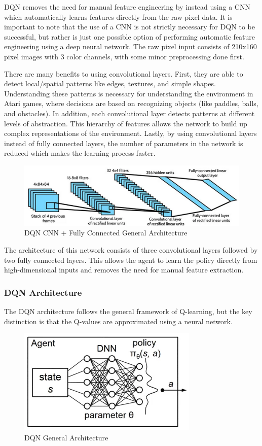 \documentclass{article}
\begin{document}
DQN removes the need for manual feature engineering by instead using a CNN which automatically learns features directly from the raw pixel data. 
It is important to note that the use of a CNN is not strictly necessary for DQN to be successful, but rather is just one possible option of performing automatic feature engineering using a deep neural network.
The raw pixel input consists of 210x160 pixel images with 3 color channels, with some minor preprocessing done first.

There are many benefits to using convolutional layers.
First, they are able to detect local/spatial patterns like edges, textures, and simple shapes. Understanding these patterns is necessary for understanding the environment in Atari games, where decisions are based on recognizing objects (like paddles, balls, and obstacles).
In addition, each convolutional layer detects patterns at different levels of abstraction. This hierarchy of features allows the network to build up complex representations of the environment.
Lastly, by using convolutional layers instead of fully connected layers, the number of parameters in the network is reduced which makes the learning process faster.

\begin{figure}[H]
    \centering
    \includegraphics[width=0.75\linewidth]{image2.png}
    \caption{DQN CNN + Fully Connected General Architecture}
    \label{fig:enter-label}
\end{figure}

The architecture of this network consists of three convolutional layers followed by two fully connected layers.
This allows the agent to learn the policy directly from high-dimensional inputs and removes the need for manual feature extraction.

\subsubsection{DQN Architecture}

The DQN architecture follows the general framework of Q-learning, but the key distinction is that the Q-values are approximated using a neural network.

\vspace{-.5cm}\begin{figure}[H]
    \centering
    \includegraphics[width=0.4\linewidth]{dqnarch.png}
    \caption{DQN General Architecture}
    \label{fig:enter-label}
\end{figure}
\end{document}
